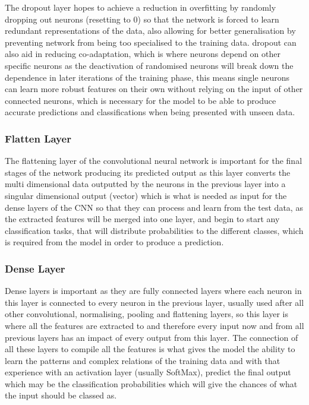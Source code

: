\documentclass[]{final_report}
\begin{document}
The dropout layer hopes to achieve a reduction in overfitting by randomly dropping out neurons (resetting to 0) so that the network is forced to learn redundant representations of the data, also allowing for better generalisation by preventing network from being too specialised to the training data. dropout can also aid in reducing co-adaptation, which is where neurons depend on other specific neurons as the deactivation of randomised neurons will break down the dependence in later iterations of the training phase, this means single neurons can learn more robust features on their own without relying on the input of other connected neurons, which is necessary for the model to be able to produce accurate predictions and classifications when being presented with unseen data.

\subsubsection{Flatten Layer}

The flattening layer of the convolutional neural network is important for the final stages of the network producing its predicted output as this layer converts the multi dimensional data outputted by the neurons in the previous layer into a singular dimensional output (vector) which is what is needed as input for the dense layers of the CNN so that they can process and learn from the test data, as the extracted features will be merged into one layer, and begin to start any classification tasks, that will distribute probabilities to the different classes, which is required from the model in order to produce a prediction. 

\subsubsection{Dense Layer}

Dense layers is important as they are fully connected layers where each neuron in this layer is connected to every neuron in the previous layer, usually used after all other convolutional, normalising, pooling  and flattening layers, so this layer is where all the features are extracted to and therefore every input now and from all previous layers has an impact of every output from this layer. The connection of all these layers to compile all the features is what gives the model the ability to learn the patterns and complex relations of the training data and with that experience with an activation layer (usually SoftMax), predict the final output which may be the classification probabilities which will give the chances of what the input should be classed as. 
\end{document}
